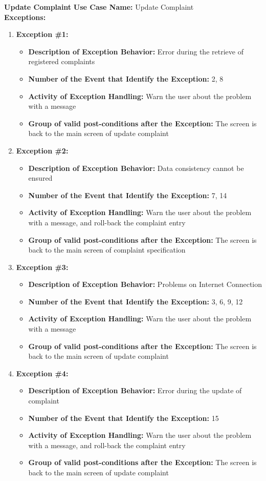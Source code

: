 \documentclass[11pt,twoside]{article}
\begin{document}
\textbf{Update Complaint}
\textbf{Use Case Name:} Update Complaint\\
\textbf{Exceptions:}
\begin{enumerate}
 \item \textbf{Exception \#1:}
 \begin{itemize}
  \item \textbf{Description of Exception Behavior:} Error during the retrieve of registered complaints
  \item \textbf{Number of the Event that Identify the Exception:} 2, 8
  \item \textbf{Activity of Exception Handling:} Warn the user about the problem with a message
  \item \textbf{Group of valid post-conditions after the Exception:} The screen is back to the main screen of update complaint
 \end{itemize}
 \item \textbf{Exception \#2:}
 \begin{itemize}
  \item \textbf{Description of Exception Behavior:} Data consistency cannot be ensured
  \item \textbf{Number of the Event that Identify the Exception:} 7, 14
  \item \textbf{Activity of Exception Handling:} Warn the user about the problem with a message, and roll-back the complaint entry
  \item \textbf{Group of valid post-conditions after the Exception:} The screen is back to the main screen of complaint specification
 \end{itemize}
 \item \textbf{Exception \#3:}
 \begin{itemize}
  \item \textbf{Description of Exception Behavior:} Problems on Internet Connection
  \item \textbf{Number of the Event that Identify the Exception:} 3, 6, 9, 12
  \item \textbf{Activity of Exception Handling:} Warn the user about the problem with a message
  \item \textbf{Group of valid post-conditions after the Exception:} The screen is back to the main screen of update complaint
 \end{itemize}
 \item \textbf{Exception \#4:}
 \begin{itemize}
  \item \textbf{Description of Exception Behavior:} Error during the update of complaint
  \item \textbf{Number of the Event that Identify the Exception:} 15
  \item \textbf{Activity of Exception Handling:} Warn the user about the problem with a message, and roll-back the complaint entry
  \item \textbf{Group of valid post-conditions after the Exception:} The screen is back to the main screen of update complaint
 \end{itemize}
\end{enumerate}
\end{document}

